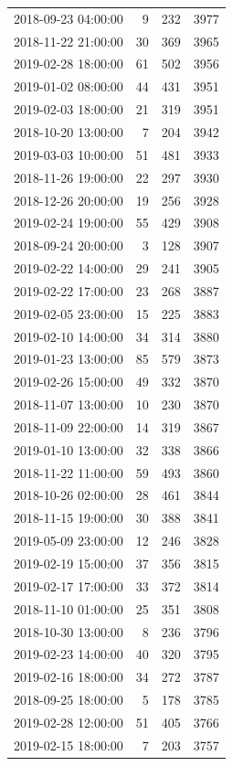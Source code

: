 \begin{tabular}{lrrr}
2018-09-23 04:00:00 & 9 & 232 & 3977 \\
2018-11-22 21:00:00 & 30 & 369 & 3965 \\
2019-02-28 18:00:00 & 61 & 502 & 3956 \\
2019-01-02 08:00:00 & 44 & 431 & 3951 \\
2019-02-03 18:00:00 & 21 & 319 & 3951 \\
2018-10-20 13:00:00 & 7 & 204 & 3942 \\
2019-03-03 10:00:00 & 51 & 481 & 3933 \\
2018-11-26 19:00:00 & 22 & 297 & 3930 \\
2018-12-26 20:00:00 & 19 & 256 & 3928 \\
2019-02-24 19:00:00 & 55 & 429 & 3908 \\
2018-09-24 20:00:00 & 3 & 128 & 3907 \\
2019-02-22 14:00:00 & 29 & 241 & 3905 \\
2019-02-22 17:00:00 & 23 & 268 & 3887 \\
2019-02-05 23:00:00 & 15 & 225 & 3883 \\
2019-02-10 14:00:00 & 34 & 314 & 3880 \\
2019-01-23 13:00:00 & 85 & 579 & 3873 \\
2019-02-26 15:00:00 & 49 & 332 & 3870 \\
2018-11-07 13:00:00 & 10 & 230 & 3870 \\
2018-11-09 22:00:00 & 14 & 319 & 3867 \\
2019-01-10 13:00:00 & 32 & 338 & 3866 \\
2018-11-22 11:00:00 & 59 & 493 & 3860 \\
2018-10-26 02:00:00 & 28 & 461 & 3844 \\
2018-11-15 19:00:00 & 30 & 388 & 3841 \\
2019-05-09 23:00:00 & 12 & 246 & 3828 \\
2019-02-19 15:00:00 & 37 & 356 & 3815 \\
2019-02-17 17:00:00 & 33 & 372 & 3814 \\
2018-11-10 01:00:00 & 25 & 351 & 3808 \\
2018-10-30 13:00:00 & 8 & 236 & 3796 \\
2019-02-23 14:00:00 & 40 & 320 & 3795 \\
2019-02-16 18:00:00 & 34 & 272 & 3787 \\
2018-09-25 18:00:00 & 5 & 178 & 3785 \\
2019-02-28 12:00:00 & 51 & 405 & 3766 \\
2019-02-15 18:00:00 & 7 & 203 & 3757 \\

\end{tabular}
